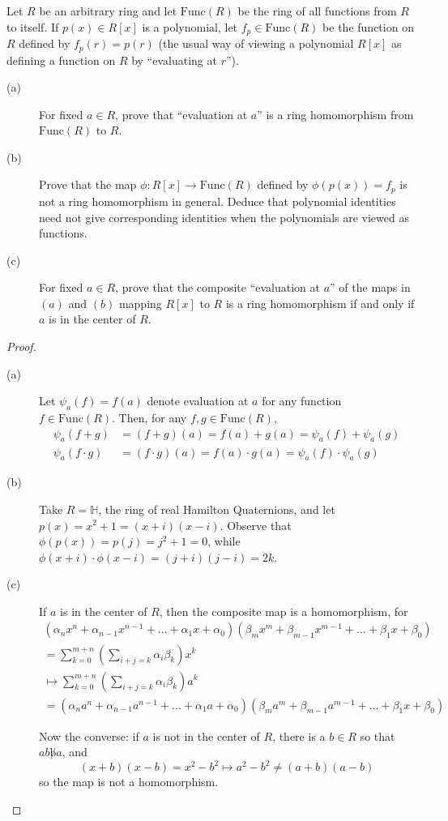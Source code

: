 \documentclass[12pt,leqno]{book}
\numberwithin{equation}{section}
\newcommand{\question}[2] {\vspace{.25in}\noindent\fbox{#1} #2 \vspace{.10in}}
\theoremstyle{definition}
\begin{document}
\question{18}{Let $R$ be an arbitrary ring and let $\text{Func}(R)$ be the ring of all functions from $R$ to itself. If $p(x)\in R[x]$ is a polynomial, let $f_p\in\text{Func}(R)$ be the function on $R$ defined by $f_p(r)=p(r)$ (the usual way of viewing a polynomial $R[x]$ as defining a function on $R$ by ``evaluating at $r$'').}
\begin{description}
 \item [(a)] For fixed $a\in R$, prove that ``evaluation at $a$'' is a ring homomorphism from $\text{Func}(R)$ to $R$.
 \item [(b)] Prove that the map $\phi:R[x]\to\text{Func}(R)$ defined by $\phi(p(x))=f_p$ is not a ring homomorphism in general. Deduce that polynomial identities need not give corresponding identities when the polynomials are viewed as functions.
 \item [(c)] For fixed $a\in R$, prove that the composite ``evaluation at $a$'' of the maps in $(a)$ and $(b)$ mapping $R[x]$ to $R$ is a ring homomorphism if and only if $a$ is in the center of $R$.
\end{description}

\begin{proof}\indent
 \begin{description}
  \item [(a)] Let $\psi_a(f)=f(a)$ denote evaluation at $a$ for any function $f\in\text{Func}(R)$. Then, for any $f,g\in\text{Func}(R)$, \begin{align*}\psi_a(f+g)&=(f+g)(a)=f(a)+g(a)=\psi_a(f)+\psi_a(g)\\\psi_a(f\cdot g)&=(f\cdot g)(a)=f(a)\cdot g(a)=\psi_a(f)\cdot\psi_a(g)\end{align*}
  \item [(b)] Take $R=\mathbb{H}$, the ring of real Hamilton Quaternions, and let $p(x)=x^2+1=(x+i)(x-i)$. Observe that $\phi(p(x))=p(j)=j^2+1=0$, while $\phi(x+i)\cdot\phi(x-i)=(j+i)(j-i)=2k$. 
  \item [(c)] If $a$ is in the center of $R$, then the composite map is a homomorphism, for \begin{align*}\left(\alpha_nx^n+\alpha_{n-1}x^{n-1}+\hdots+\alpha_1x+\alpha_0\right)\left(\beta_mx^m+\beta_{m-1}x^{m-1}+\hdots+\beta_1x+\beta_0\right)\\=\sum_{k=0}^{m+n}\left(\sum_{i+j=k}\alpha_i\beta_k\right)x^k\\\mapsto\sum_{k=0}^{m+n}\left(\sum_{i+j=k}\alpha_i\beta_k\right)a^k\\=\left(\alpha_na^n+\alpha_{n-1}a^{n-1}+\hdots+\alpha_1a+\alpha_0\right)\left(\beta_ma^m+\beta_{m-1}a^{m-1}+\hdots+\beta_1x+\beta_0\right)\end{align*} 

Now the converse: if $a$ is not in the center of $R$, there is a $b\in R$ so that $ab\not ba$, and \[(x+b)(x-b)=x^2-b^2\mapsto a^2-b^2\not=(a+b)(a-b)\] so the map is not a homomorphism.\qedhere
 \end{description}

\end{proof}
\end{document}
